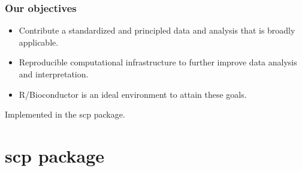 \documentclass{beamer}
\newcommand{\hcode}[2][lgray]{{\ttfamily\color{vdgray}\colorbox{#1}{#2}}}
\newcommand{\frametitlesection}[1]{\frametitle{\centering #1 \footnotesize \hspace{0pt plus 1 filll} \insertsection}}
\begin{document}
\begin{frame}
    \frametitlesection{Our objectives}
  
    \begin{itemize}
    \item Contribute a standardized and principled data and analysis
      that is broadly applicable.

    \item Reproducible computational infrastructure to further
      improve data analysis and interpretation.

    \item  R/Bioconductor is an ideal environment to attain these goals.
      
    \end{itemize}

    \bigskip
    
    Implemented in the \hcode{scp} package.

\end{frame}



\section{scp package}
\end{document}
